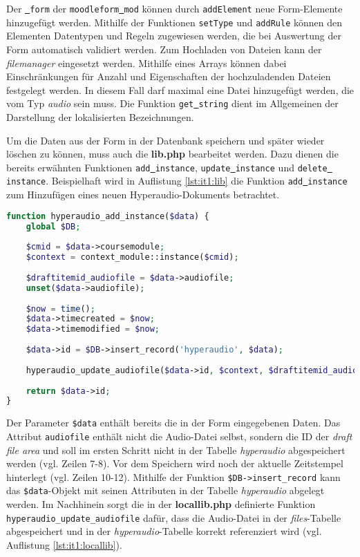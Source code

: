 Der \texttt{\underline{{ }}form} der \texttt{moodleform\underline{{ }}mod} können durch \texttt{addElement} neue Form-Elemente hinzugefügt werden. Mithilfe der Funktionen \texttt{setType} und \texttt{addRule} können den Elementen Datentypen und Regeln zugewiesen werden, die bei Auswertung der Form automatisch validiert werden. Zum Hochladen von Dateien kann der \textit{filemanager} eingesetzt werden. Mithilfe eines Arrays können dabei Einschränkungen für Anzahl und Eigenschaften der hochzuladenden Dateien festgelegt werden. In diesem Fall darf maximal eine Datei hinzugefügt werden, die vom Typ \textit{audio} sein muss. Die Funktion \texttt{get\underline{{ }}string} dient im Allgemeinen der Darstellung der lokalisierten Bezeichnungen.

Um die Daten aus der Form in der Datenbank speichern und später wieder löschen zu können, muss auch die \textbf{lib.php} bearbeitet werden. Dazu dienen die bereits erwähnten Funktionen \texttt{add\underline{{ }}instance}, \texttt{update\underline{{ }}instance} und \texttt{delete\underline{{ }}instance}. Beispielhaft wird in Auflistung \ref{lst:it1:lib} die Funktion \texttt{add\underline{{ }}instance} zum Hinzufügen eines neuen Hyperaudio-Dokuments betrachtet. 

\begin{lstlisting}[language=php,
             linewidth=\textwidth,
             caption={Ausschnitt der \textbf{lib.php} in der 1. Iteration},
             label={lst:it1:lib}]
function hyperaudio_add_instance($data) {
    global $DB;
    
    $cmid = $data->coursemodule;
    $context = context_module::instance($cmid);
    
    $draftitemid_audiofile = $data->audiofile;
    unset($data->audiofile);
     
    $now = time();
    $data->timecreated = $now;
    $data->timemodified = $now;
    
    $data->id = $DB->insert_record('hyperaudio', $data);
    
    hyperaudio_update_audiofile($data->id, $context, $draftitemid_audiofile);
     
    return $data->id;
}
\end{lstlisting}

Der Parameter \texttt{\$data} enthält bereits die in der Form eingegebenen Daten. Das Attribut \mbox{\texttt{audiofile}} enthält nicht die Audio-Datei selbst, sondern die ID der \textit{draft file area} und soll im ersten Schritt nicht in der Tabelle \textit{hyperaudio} abgespeichert werden (vgl. Zeilen 7-8). Vor dem Speichern wird noch der aktuelle Zeitstempel hinterlegt (vgl. Zeilen 10-12). Mithilfe der Funktion \mbox{\texttt{\$DB->insert_record}} kann das \texttt{\$data}-Objekt mit seinen Attributen in der Tabelle \textit{hyperaudio} abgelegt werden. Im Nachhinein sorgt die in der \textbf{locallib.php} definierte Funktion \mbox{\texttt{hyperaudio_update_audiofile}} dafür, dass die Audio-Datei in der \textit{files}-Tabelle abgespeichert und in der \textit{hyperaudio}-Tabelle korrekt referenziert wird (vgl. Auflistung \ref{lst:it1:locallib}).

